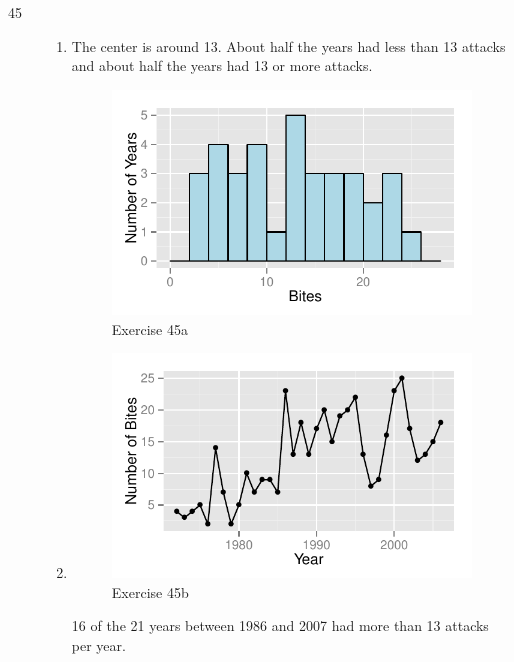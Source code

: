 \documentclass[letterpaper, landscape]{exam}
\begin{document}
\begin{description}
\begin{enumerate}[{a}]
        \end{enumerate}

      \newpage

      \item[45]
        \begin{enumerate}[{a}]
          \item
            The center is around 13.  About half the years had less than 13
            attacks and about half the years had 13 or more attacks.  

            \begin{figure}[H]
              \centering
              \includegraphics{figures/ex45a.pdf}
              \caption{Exercise 45a}
            \end{figure}

          \item
            \begin{figure}[H]
              \centering
              \includegraphics{figures/ex45b.pdf}
              \caption{Exercise 45b}
            \end{figure}

            16 of the 21 years between 1986 and 2007 had more than 13 attacks per year.

        \end{enumerate}


    \end{description}
\end{document}
